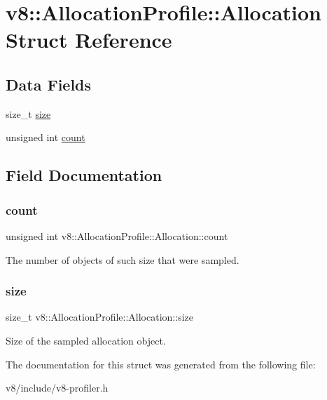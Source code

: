 \hypertarget{structv8_1_1AllocationProfile_1_1Allocation}{}\section{v8\+:\+:Allocation\+Profile\+:\+:Allocation Struct Reference}
\label{structv8_1_1AllocationProfile_1_1Allocation}
\subsection*{Data Fields}
\begin{DoxyCompactItemize}
\item 
size\+\_\+t \mbox{\hyperlink{structv8_1_1AllocationProfile_1_1Allocation_a346410fa5dfb796dff396069897c0aba}{size}}
\item 
unsigned int \mbox{\hyperlink{structv8_1_1AllocationProfile_1_1Allocation_a012fe5238f5ebec039d7832f2d3ae8ed}{count}}
\end{DoxyCompactItemize}


\subsection{Field Documentation}
\mbox{\label{structv8_1_1AllocationProfile_1_1Allocation_a012fe5238f5ebec039d7832f2d3ae8ed}} 
\subsubsection{\texorpdfstring{count}{count}}
{\footnotesize\ttfamily unsigned int v8\+::\+Allocation\+Profile\+::\+Allocation\+::count}

The number of objects of such size that were sampled. \mbox{\label{structv8_1_1AllocationProfile_1_1Allocation_a346410fa5dfb796dff396069897c0aba}} 
\subsubsection{\texorpdfstring{size}{size}}
{\footnotesize\ttfamily size\+\_\+t v8\+::\+Allocation\+Profile\+::\+Allocation\+::size}

Size of the sampled allocation object. 

The documentation for this struct was generated from the following file\+:\begin{DoxyCompactItemize}
\item 
v8/include/v8-\/profiler.\+h\end{DoxyCompactItemize}
